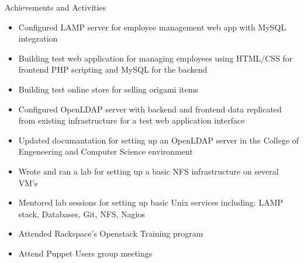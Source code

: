 \documentclass[11pt,oneside]{article}
\newenvironment{ressection}[1]{
	\vspace{4pt}
	{\fontfamily{phv}\selectfont\Large#1}
	\begin{itemize}
	\vspace{3pt}
}{
	\end{itemize}
}
\newcommand{\resitem}[1]{
	\vspace{-4pt}
	\item \begin{flushleft} #1 \end{flushleft}
}
\begin{document}
\begin{ressection}{Achievements and Activities}
    \resitem{Configured LAMP server for employee management web app with MySQL integration}
    \resitem{Building test web application for managing employees using HTML/CSS for frontend PHP scripting and MySQL for the backend}
    \resitem{Building test online store for selling origami items}
    \resitem{Configured OpenLDAP server with backend and frontend data replicated from existing infrastructure for a test web application interface}
    \resitem{Updated documantation for setting up an OpenLDAP server in the College of Engeneering and Computer Science environment}
    \resitem{Wrote and ran a lab for setting up a basic NFS infrastructure on several VM's}
    \resitem{Mentored lab sessions for setting up basic Unix services including: LAMP stack, Databases, Git, NFS, Nagios}
    \resitem{Attended Rackspace's Openstack Training program}
    \resitem{Attend Puppet Users group meetings}
\end{ressection}
\end{document}
